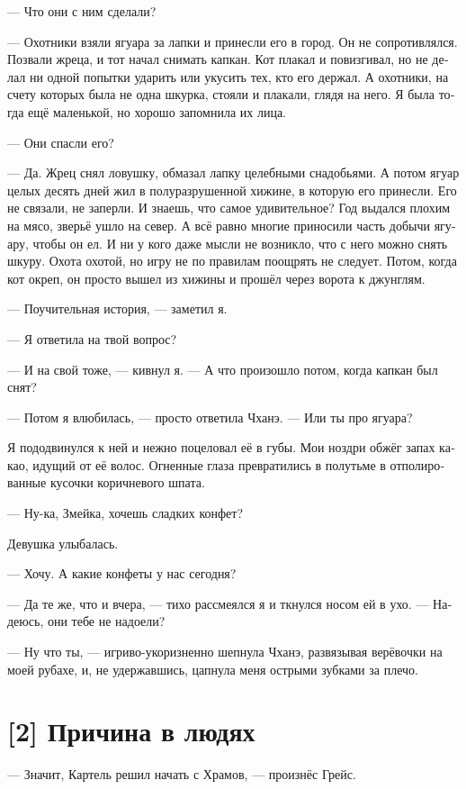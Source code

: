 \documentclass[a4paper,12pt,fleqn]{book}\usepackage{polyglossia}\setdefaultlanguage[babelshorthands=true]{russian}\setotherlanguage{english}\defaultfontfeatures{Ligatures=TeX,Mapping=tex-text}\usepackage{xcolor}\newcommand{\ml}[3]{#2}
\begin{document}
{--- Что они с ним сделали?

--- Охотники взяли ягуара за лапки и принесли его в город.
Он не сопротивлялся.
Позвали жреца, и тот начал снимать капкан.
Кот плакал и повизгивал, но не делал ни одной попытки ударить или укусить тех, кто его держал.
А охотники, на счету которых была не одна шкурка, стояли и плакали, глядя на него.
Я была тогда ещё маленькой, но хорошо запомнила их лица.

--- Они спасли его?

--- Да.
Жрец снял ловушку, обмазал лапку целебными снадобьями.
А потом ягуар целых десять дней жил в полуразрушенной хижине, в которую его принесли.
Его не связали, не заперли.
И знаешь, что самое удивительное?
Год выдался плохим на мясо, зверьё ушло на север.
А всё равно многие приносили часть добычи ягуару, чтобы он ел.
И ни у кого даже мысли не возникло, что с него можно снять шкуру.
Охота охотой, но игру не по правилам поощрять не следует.
Потом, когда кот окреп, он просто вышел из хижины и прошёл через ворота к джунглям.

--- Поучительная история, --- заметил я.

--- Я ответила на твой вопрос?

--- И на свой тоже, --- кивнул я.
--- А что произошло потом, когда капкан был снят?

--- Потом я влюбилась, --- просто ответила Чханэ.
--- Или ты про ягуара?

Я пододвинулся к ней и нежно поцеловал её в губы.
Мои ноздри обжёг запах какао, идущий от её волос.
Огненные глаза превратились в полутьме в отполированные кусочки коричневого шпата.

--- Ну-ка, Змейка, хочешь сладких конфет?

Девушка улыбалась.

--- Хочу.
А какие конфеты у нас сегодня?

--- Да те же, что и вчера, --- тихо рассмеялся я и ткнулся носом ей в ухо.
--- Надеюсь, они тебе не надоели?

--- Ну что ты, --- игриво-укоризненно шепнула Чханэ, развязывая верёвочки на моей рубахе, и, не удержавшись, цапнула меня острыми зубками за плечо.

\section{[2] Причина в людях}

--- Значит, Картель решил начать с Храмов, --- произнёс Грейс.

}
\end{document}
